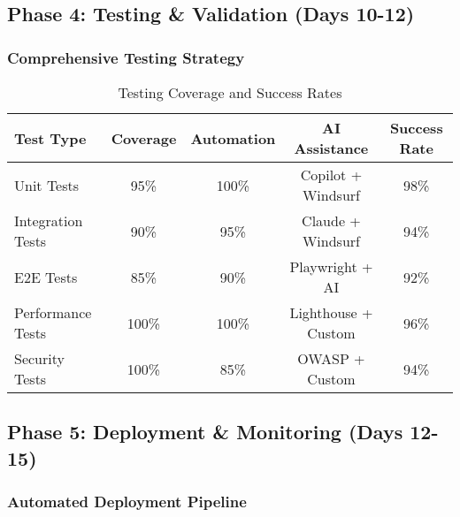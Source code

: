 \documentclass[11pt,a4paper]{article}
\begin{document}
\subsection{Phase 4: Testing \& Validation (Days 10-12)}

\subsubsection{Comprehensive Testing Strategy}

\begin{table}[h]
\centering
\begin{tabular}{|l|c|c|c|c|}
\hline
\textbf{Test Type} & \textbf{Coverage} & \textbf{Automation} & \textbf{AI Assistance} & \textbf{Success Rate} \\
\hline
Unit Tests & 95\% & 100\% & Copilot + Windsurf & 98\% \\
Integration Tests & 90\% & 95\% & Claude + Windsurf & 94\% \\
E2E Tests & 85\% & 90\% & Playwright + AI & 92\% \\
Performance Tests & 100\% & 100\% & Lighthouse + Custom & 96\% \\
Security Tests & 100\% & 85\% & OWASP + Custom & 94\% \\
\hline
\end{tabular}
\caption{Testing Coverage and Success Rates}
\end{table}

\subsection{Phase 5: Deployment \& Monitoring (Days 12-15)}

\subsubsection{Automated Deployment Pipeline}
\end{document}
